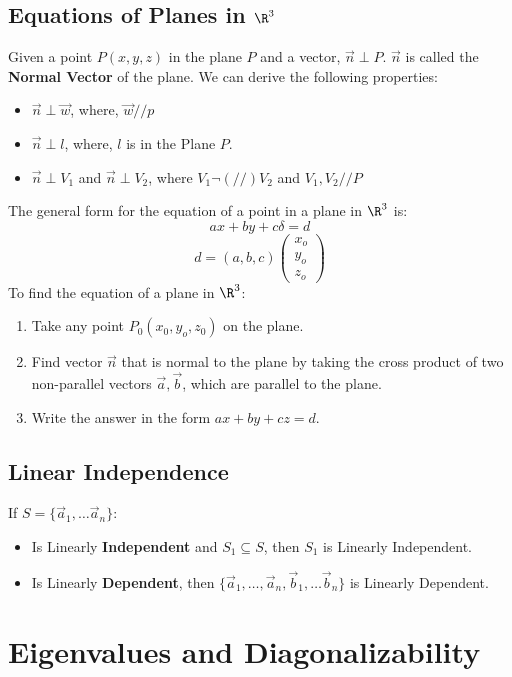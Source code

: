 \documentclass[a4paper]{article}
\begin{document}
  \subsection[Equations of Planes]{Equations of Planes in $\R^3$}
  Given a point $P(x,y,z)$ in the plane $P$ and a vector, $\vec{n} \perp P$. $\vec{n}$ is called the \textbf{Normal Vector} of the plane. We can derive the following properties:
  \begin{itemize}
    \item $\vec{n} \perp \vec{w}$, where, $\vec{w} // p $
    \item $\vec{n} \perp l$, where, $l$ is in the Plane $P$.
    \item $\vec{n} \perp V_1$ and $\vec{n} \perp V_2$, where $V_1 \lnot (//) V_2$ and $V_1,V_2 // P$
  \end{itemize}
  The general form for the equation of a point in a plane in $\R^3$ is:
  \[
    ax + by + c\delta = d
  \]
  \[
    d = (a,b,c)
    \begin{pmatrix}
      x_o \\ y_o \\ z_o
    \end{pmatrix}
  \]
  To find the equation of a plane in $\R^3$:
  \begin{enumerate}
    \item Take any point $P_0(x_0,y_o,z_0)$ on the plane.
    \item Find vector $\vec{n}$ that is normal to the plane by taking the cross product of two non-parallel vectors $\vec{a},\vec{b}$, which are parallel to the plane.
    \item Write the answer in the form $ax+by+cz = d$.
  \end{enumerate}
  \subsection{Linear Independence}
  If $S = \{\vec{a}_1 , \dots \vec{a}_n\}$:
  \begin{itemize}
    \item Is Linearly \textbf{Independent} and $S_1 \subseteq S$, then $S_1$ is Linearly Independent.
    \item Is Linearly \textbf{Dependent}, then $\{\vec{a}_1, \dots, \vec{a}_n, \vec{b}_1, \dots \vec{b}_n\}$ is Linearly Dependent.
  \end{itemize}
  \section{Eigenvalues and Diagonalizability}
\end{document}
